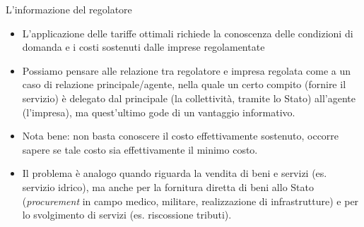 \documentclass[aspectratio=64,11pt]{beamer}
\begin{document}
\begin{frame}{L'informazione del regolatore}
\begin{itemize}
\item L'applicazione delle tariffe ottimali richiede la conoscenza delle
condizioni di domanda e i costi sostenuti dalle imprese regolamentate
\item Possiamo pensare alle relazione tra regolatore e impresa regolata come a un
caso di relazione \alert{principale/agente}, nella quale un certo compito (fornire
il servizio) è delegato dal principale (la collettività, tramite lo Stato)
all'agente (l'impresa), ma quest'ultimo gode di un vantaggio informativo.
\item Nota bene: non basta conoscere il costo effettivamente sostenuto, occorre
sapere se tale costo sia effettivamente il \alert{minimo costo}.
\item Il problema è analogo quando riguarda la vendita di beni e servizi
(es. servizio idrico), ma anche per la fornitura diretta di beni allo Stato
(\emph{procurement} in campo medico, militare, realizzazione di infrastrutture) e
per lo svolgimento di servizi (es. riscossione tributi).
\end{itemize}
\end{frame}
\end{document}
